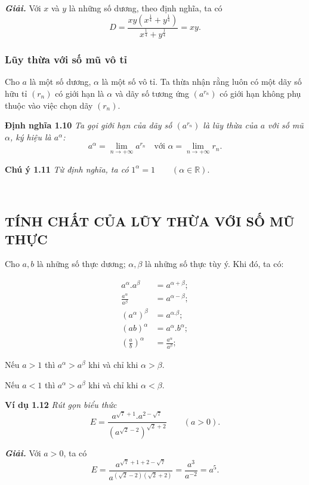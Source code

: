 \documentclass{article}
\begin{document}
\textbf{\color{blue}\textit{Giải.}} Với $x$ và $y$ là những số dương, theo định nghĩa, ta có
\[
D = \frac{xy(x^{\frac{1}{4}} + y^{\frac{1}{4}})}{x^{\frac{1}{4}} + y^{\frac{1}{4}}} = xy.
\]

\subsubsection{Lũy thừa với số mũ vô tỉ}

Cho $a$ là một số dương, $\alpha$ là một số vô tỉ. Ta thừa nhận rằng luôn có một dãy số hữu tỉ $(r_n)$ có giới hạn là $\alpha$ và dãy số tương ứng $(a^{r_n})$ có giới hạn không phụ thuộc vào việc chọn dãy $(r_n)$.

\textbf{Định nghĩa 1.10} \textit{Ta gọi giới hạn của dãy số $(a^{r_n})$ là lũy thừa của $a$ với số mũ $\alpha$, ký hiệu là $a^\alpha$:}
\[
a^\alpha = \lim_{n \to +\infty} a^{r_n} \quad \text{với } \alpha = \lim_{n \to +\infty} r_n.
\]

\textbf{Chú ý 1.11} \textit{Từ định nghĩa, ta có } $1^\alpha = 1 \qquad (\alpha \in \mathbb{R})$.

\
\subsection{TÍNH CHẤT CỦA LŨY THỪA VỚI SỐ MŨ THỰC}

Cho $a, b$ là những số thực dương; $\alpha, \beta$ là những số thực tùy ý. Khi đó, ta có:

\[
\begin{aligned}
a^\alpha . a^\beta &= a^{\alpha+\beta}; \\[4pt]
\frac{a^\alpha}{a^\beta} &= a^{\alpha-\beta}; \\[4pt]
(a^\alpha)^\beta &= a^{\alpha . \beta}; \\[4pt]
(ab)^\alpha &= a^\alpha . b^\alpha; \\[4pt]
\left(\frac{a}{b}\right)^\alpha &= \frac{a^\alpha}{a^\beta};
\end{aligned}
\]

Nếu $a > 1$ thì $a^\alpha > a^\beta$ khi và chỉ khi $\alpha > \beta$.

Nếu $a < 1$ thì $a^\alpha > a^\beta$ khi và chỉ khi $\alpha < \beta$.

\vspace{1em}

\textbf{Ví dụ 1.12} \textit{Rút gọn biểu thức}
\[
E = \frac{a^{\sqrt{7}+1} . a^{2-\sqrt{7}}}{(a^{\sqrt{2}-2})^{\sqrt{2}+2}} \qquad (a > 0).
\]

\textbf{\color{blue}\textit{Giải.}} Với $a > 0$, ta có
\[
E = \frac{a^{\sqrt{7}+1+2-\sqrt{7}}}{a^{(\sqrt{2}-2)(\sqrt{2}+2)}} = \frac{a^3}{a^{-2}} = a^5.
\]
\end{document}
